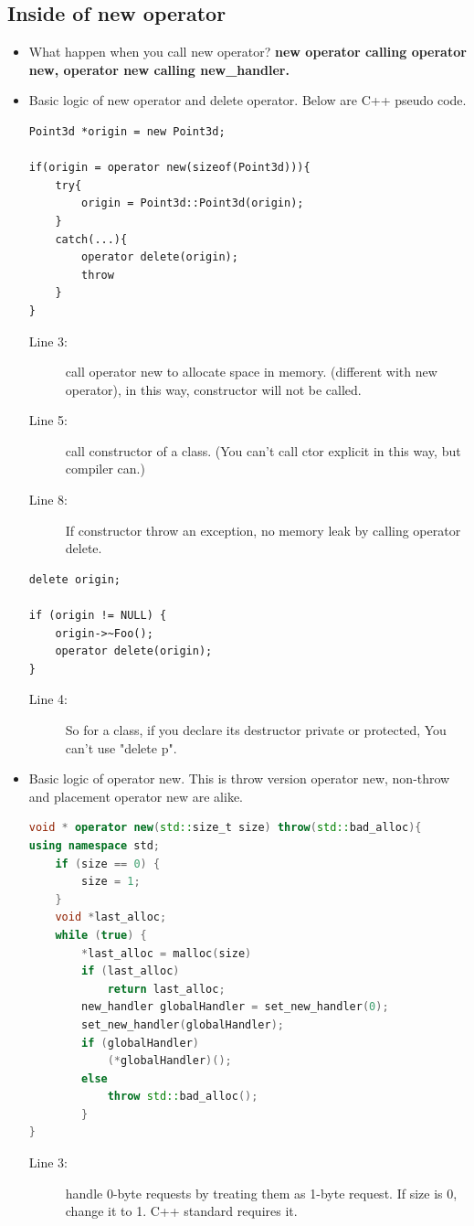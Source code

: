 \documentclass[a4paper,11pt,twoside]{book}
\begin{document}
\subsection{Inside of new operator}
\begin{itemize}
    \item What happen when you call new operator? \textbf{new operator calling operator new, operator new calling new\_handler.} 
	
	\item Basic logic of new operator and delete operator. Below are C++ pseudo code.
\begin{lstlisting}[]
Point3d *origin = new Point3d;
	
if(origin = operator new(sizeof(Point3d))){
	try{
		origin = Point3d::Point3d(origin);
	}
	catch(...){
		operator delete(origin);
		throw
	}
}
\end{lstlisting}
\begin{description}
    \item[Line 3:] call operator new to allocate space in memory. (different with new operator), in this way, constructor will not be called.
    \item[Line 5:] call constructor of a class. (You can't call ctor explicit in this way, but compiler can.)
    \item[Line 8:] If constructor throw an exception, no memory leak by calling operator delete.
\end{description}
	
\begin{lstlisting}[]
delete origin;
	
if (origin != NULL) {
	origin->~Foo();
	operator delete(origin);
}
\end{lstlisting}
\begin{description}
    \item[Line 4:] So for a class, if you declare its destructor private or protected, You can't use "delete p".
\end{description}
	
\item Basic logic of operator new. This is throw version operator new, non-throw and placement operator new are alike. 
\begin{lstlisting}[frame=single, language=c++]
void * operator new(std::size_t size) throw(std::bad_alloc){
using namespace std; 
	if (size == 0) {   
		size = 1;             
	}                 
	void *last_alloc;
	while (true) {
		*last_alloc = malloc(size)
		if (last_alloc)
			return last_alloc;
		new_handler globalHandler = set_new_handler(0);
		set_new_handler(globalHandler);
		if (globalHandler) 
			(*globalHandler)();
		else 
			throw std::bad_alloc();
		}
}
	\end{lstlisting}
\begin{description}
	\item[Line 3:] handle 0-byte requests by treating them as 1-byte request. If size is 0, change it to 1. C++ standard requires it.
	

\end{description}
\end{itemize}
\end{document}
